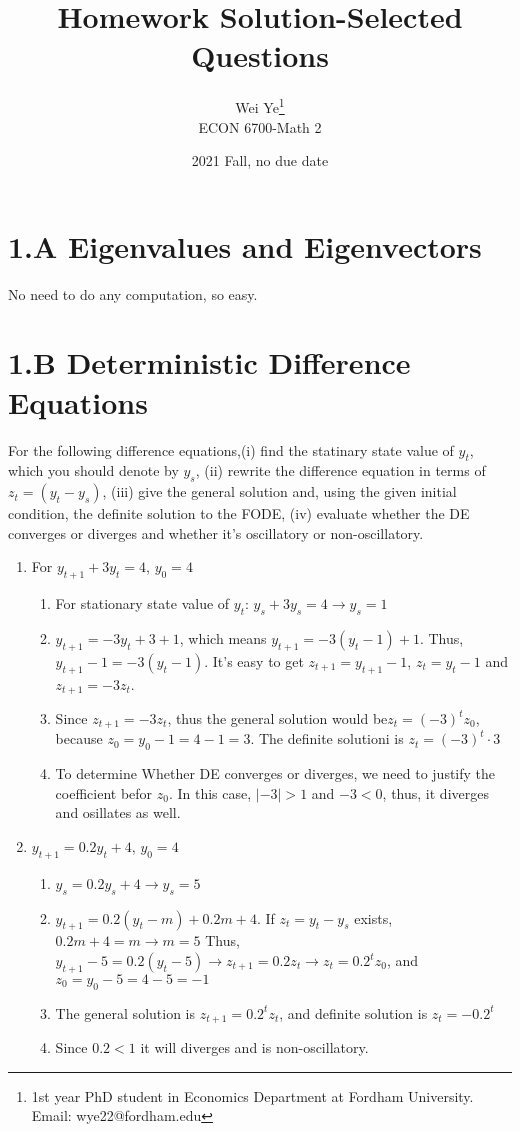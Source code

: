 \documentclass[11pt]{article} %
\title{Homework Solution-Selected Questions}
\author{Wei Ye\footnote{ 1st year PhD student in Economics Department at Fordham University. Email: wye22@fordham.edu}
    \\ ECON 6700-Math 2}
\date{2021 Fall, no due date}
\begin{document}
\maketitle

\section{1.A Eigenvalues and Eigenvectors}
No need to do any computation, so easy.
\section{1.B Deterministic Difference Equations}
For the following difference equations,(i) find the statinary state value of $y_t$, which you should denote by $y_s$, (ii) rewrite the difference equation in terms of $z_t=(y_t-y_s)$, (iii) give the general solution and, using the given initial condition, the definite solution to the FODE, (iv) evaluate whether the DE converges or diverges and whether it's oscillatory or non-oscillatory. 
\begin{enumerate}
    \item For $y_{t+1}+3y_t=4$, $y_0=4$
        \begin{enumerate}
            \item For stationary state value of $y_t$: $y_s+3y_s=4 \longrightarrow y_s=1$
            \item $y_{t+1}=-3y_t+3+1$, which means $y_{t+1}=-3(y_t-1)+1$. Thus, $y_{t+1}-1=-3(y_t-1)$.
            It's easy to get $z_{t+1}=y_{t+1}-1$, $z_t=y_t-1$ and $z_{t+1}=-3z_t$.
            \item Since $z_{t+1}=-3z_t$, thus the general solution would be$z_t=(-3)^tz_0$, because $z_0=y_0-1=4-1=3$. The 
             definite solutioni is $z_t=(-3)^t\cdot3$
             \item To determine Whether DE converges or diverges, we need to justify the coefficient befor $z_0$. In this case, $|-3|>1$ and  $-3<0$, thus, it diverges and osillates as well.
        \end{enumerate}
    
    \item $y_{t+1}=0.2y_t+4$, $y_0=4$
        \begin{enumerate}
            \item $y_s=0.2y_s+4 \longrightarrow y_s=5$
            \item $y_{t+1}=0.2(y_t-m)+0.2m+4$. If $z_t=y_t-y_s$ exists, $0.2m+4=m \longrightarrow m=5$ Thus,
               $y_{t+1}-5=0.2(y_t-5) \longrightarrow z_{t+1}=0.2z_t \longrightarrow z_t=0.2^t z_0$, and $z_0=y_0-5=4-5=-1$
            \item The general solution is $z_{t+1}=0.2^tz_t$, and definite solution is $z_t=-0.2^t$
            \item Since $0.2<1$ it will diverges and is non-oscillatory.
        \end{enumerate}
    
\end{enumerate}
\end{document}
